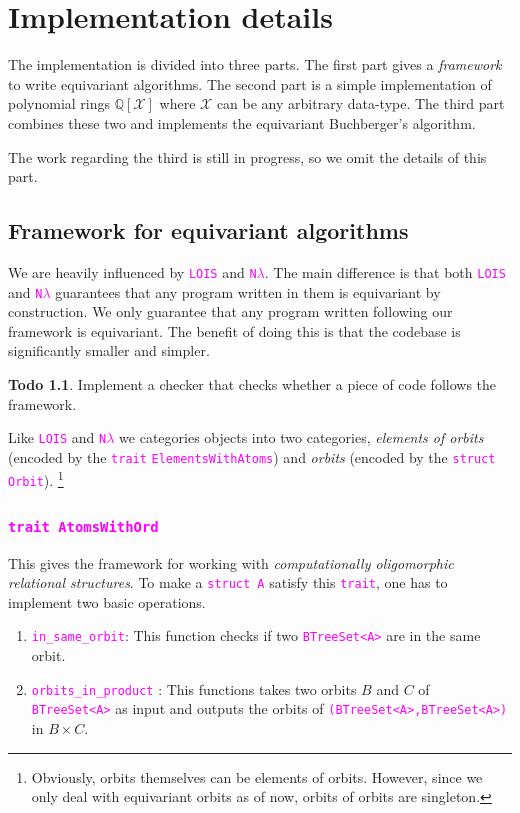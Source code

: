\documentclass[12pt,a4paper,article]{memoir}
\newcommand{\struct}{\mathcal{X}}
\newcommand{\Q}{\mathbb{Q}}
\newcommand{\poly}[2]{#1[#2]}
\newcommand{\arka}[1]{}
\newcommand{\emphdef}[1]{\emph{\textcolor{BrickRed}{#1}}}
\newcommand{\code}[1]{\texttt{\textcolor{magenta}{#1}}}
\theoremstyle{definition}
\newtheorem{todo}[theorem]{Todo}
\begin{document}
\chapter{Implementation details}\label{sec:impl}
%
The implementation is divided into three parts.
The first part gives a \emph{framework} to write equivariant algorithms.
The second part is a simple implementation of polynomial rings $\poly{\Q}{\struct}$ where $\struct$ can be any arbitrary data-type.
The third part combines these two and implements the equivariant Buchberger's algorithm.

The work regarding the third is still in progress,
so we omit the details of this part.
%
\section{Framework for equivariant algorithms}
%
We are heavily influenced by \code{LOIS} and \code{N$\lambda$}.
The main difference is that both \code{LOIS} and \code{N$\lambda$} guarantees that any program written in them is equivariant by construction.
We only guarantee that any program written following our framework is equivariant.
The benefit of doing this is that the codebase is significantly smaller and simpler.
\begin{todo}
Implement a checker that checks whether a piece of code follows the framework.
\end{todo}
%
Like \code{LOIS} and \code{N$\lambda$} we categories objects into two categories,
\emphdef{elements of orbits} (encoded by the \code{trait} \code{ElementsWithAtoms}) and \emphdef{orbits} (encoded by the \code{struct} \code{Orbit}).
\footnote{Obviously, orbits themselves can be elements of orbits.
However, since we only deal with equivariant orbits as of now,
orbits of orbits are singleton.
\arka{This is schizophrenic}}
%
\subsection{\code{trait AtomsWithOrd}}
%
This gives the framework for working with \emph{computationally oligomorphic relational structures}.
To make a \code{struct A} satisfy this \code{trait},
one has to implement two basic operations.
\begin{enumerate}
\item \code{in\_same\_orbit}: This function checks if two \code{BTreeSet<A>} are in the same orbit.
\item \code{orbits\_in\_product} : This functions takes two orbits $B$ and $C$ of \code{BTreeSet<A>} as input and outputs the orbits of \code{(BTreeSet<A>,BTreeSet<A>)} in $B\times C$. 
\end{enumerate}
%
\end{document}

